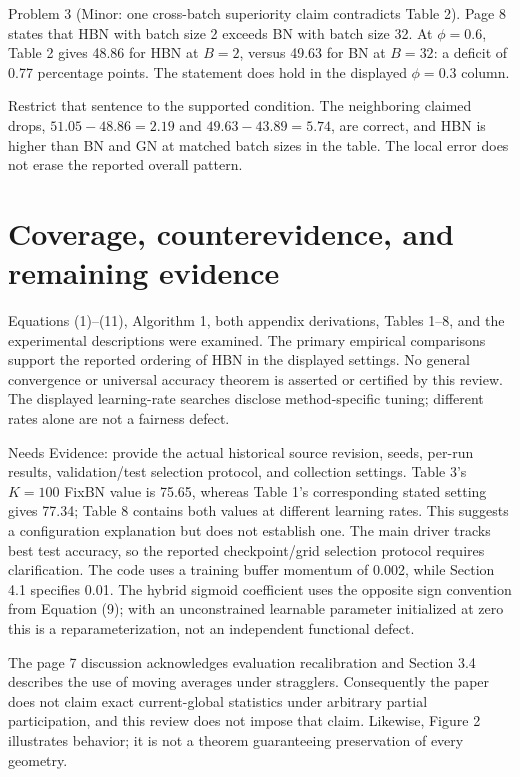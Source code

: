 \documentclass[10pt]{article}
\begin{document}
Problem 3 (Minor: one cross-batch superiority claim contradicts Table 2).  Page 8 states that HBN with batch size 2 exceeds BN with batch size 32. At \(\phi=0.6\), Table 2 gives 48.86 for HBN at \(B=2\), versus 49.63 for BN at \(B=32\): a deficit of 0.77 percentage points. The statement does hold in the displayed \(\phi=0.3\) column.\par
Restrict that sentence to the supported condition. The neighboring claimed drops, \(51.05-48.86=2.19\) and \(49.63-43.89=5.74\), are correct, and HBN is higher than BN and GN at matched batch sizes in the table. The local error does not erase the reported overall pattern.\par
\section*{Coverage, counterevidence, and remaining evidence}
Equations (1)–(11), Algorithm 1, both appendix derivations, Tables 1–8, and the experimental descriptions were examined. The primary empirical comparisons support the reported ordering of HBN in the displayed settings. No general convergence or universal accuracy theorem is asserted or certified by this review. The displayed learning-rate searches disclose method-specific tuning; different rates alone are not a fairness defect.\par
Needs Evidence: provide the actual historical source revision, seeds, per-run results, validation/test selection protocol, and collection settings. Table 3’s \(K=100\) FixBN value is 75.65, whereas Table 1’s corresponding stated setting gives 77.34; Table 8 contains both values at different learning rates. This suggests a configuration explanation but does not establish one. The main driver tracks best test accuracy, so the reported checkpoint/grid selection protocol requires clarification. The code uses a training buffer momentum of 0.002, while Section 4.1 specifies 0.01. The hybrid sigmoid coefficient uses the opposite sign convention from Equation (9); with an unconstrained learnable parameter initialized at zero this is a reparameterization, not an independent functional defect.\par
The page 7 discussion acknowledges evaluation recalibration and Section 3.4 describes the use of moving averages under stragglers. Consequently the paper does not claim exact current-global statistics under arbitrary partial participation, and this review does not impose that claim. Likewise, Figure 2 illustrates behavior; it is not a theorem guaranteeing preservation of every geometry.\par
\end{document}
